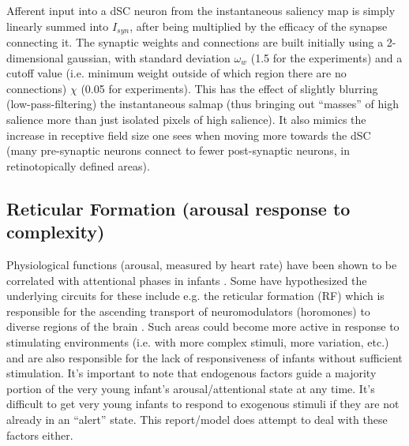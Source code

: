 \documentclass[conference]{IEEEtran}
\begin{document}
Afferent input into a dSC neuron from the instantaneous saliency map
is simply linearly summed into $I_{syn}$, after being multiplied by
the efficacy of the synapse connecting it. The synaptic weights and
connections are built initially using a 2-dimensional gaussian, with
standard deviation $\omega_w$ (1.5 for the experiments) and a cutoff
value (i.e. minimum weight outside of which region there are no
connections) $\chi$ (0.05 for experiments). This has the effect of
slightly blurring (low-pass-filtering) the instantaneous salmap (thus
bringing out ``masses'' of high salience more than just isolated
pixels of high salience). It also mimics the increase in receptive
field size one sees when moving more towards the dSC (many
pre-synaptic neurons connect to fewer post-synaptic neurons, in
retinotopically defined areas).

\subsection{Reticular Formation (arousal response to complexity)}

Physiological functions (arousal, measured by heart rate) have been
shown to be correlated with attentional phases in infants
\cite{richards_casey_1990}. Some have hypothesized the underlying
circuits for these include e.g. the reticular formation (RF) which is
responsible for the ascending transport of neuromodulators (horomones)
to diverse regions of the brain \cite{doty_1995}. Such areas could
become more active in response to stimulating environments (i.e. with
more complex stimuli, more variation, etc.) and are also responsible
for the lack of responsiveness of infants without sufficient
stimulation. It's important to note that endogenous factors guide a
majority portion of the very young infant's arousal/attentional state
at any time. It's difficult to get very young infants to respond to
exogenous stimuli if they are not already in an ``alert'' state. This
report/model does attempt to deal with these factors either.
\end{document}
